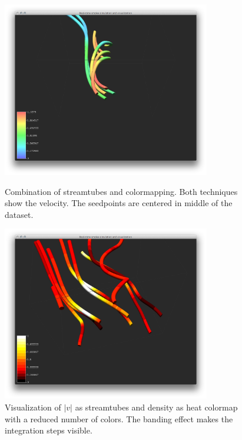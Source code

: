 \begin{figure}[htbp]
\centering
\begin{minipage}[t]{0.48\textwidth}
        \includegraphics[height=3in]{figures/streamtubes/10tubes.png}
\caption{Combination of streamtubes and colormapping. Both techniques show the velocity. The seedpoints are centered in middle of the dataset.}
\label{fig:}
\end{minipage}\hspace{.04\textwidth}%
\begin{minipage}[t]{0.48\textwidth}
    \includegraphics[height=3in]{figures/streamtubes/21banding_velodensity.png}
    \caption{Visualization of $|v|$ as streamtubes and density as heat colormap with a reduced number of colors. The banding effect makes the integration steps visible.}
    \label{fig:}
\end{minipage}
\end{figure}    

